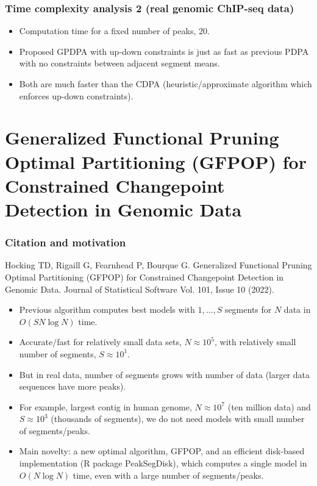 \documentclass[t]{beamer}
\begin{document}
\begin{frame}
  \frametitle{Time complexity analysis 2 (real genomic ChIP-seq data)}
  
  

  \begin{itemize}
  \item Computation time for a fixed number of peaks, 20.
  \item Proposed GPDPA with up-down constraints is just as fast as
    previous PDPA with no constraints between adjacent segment means.
  \item Both are much faster than the CDPA (heuristic/approximate
    algorithm which enforces up-down constraints).
  \end{itemize}

\end{frame}

\section{Generalized Functional Pruning Optimal Partitioning (GFPOP)
  for Constrained Changepoint Detection in Genomic Data}

\begin{frame}
  \frametitle{Citation and motivation}
  Hocking TD, Rigaill G, Fearnhead P, Bourque G. Generalized
  Functional Pruning Optimal Partitioning (GFPOP) for Constrained
  Changepoint Detection in Genomic Data. Journal of Statistical
  Software Vol. 101, Issue 10 (2022).

  \begin{itemize}
  \item Previous algorithm computes best models with $1,\dots,S$
    segments for $N$ data in $O(S N\log N)$ time.
  \item Accurate/fast for relatively small data sets, $N\approx 10^5$,
    with relatively small number of segments, $S\approx 10^1$.
  \item But in real data, number of segments grows with number of data
    (larger data sequences have more peaks).
  \item For example, largest contig in human genome, $N\approx 10^7$
    (ten million data) and $S\approx 10^3$ (thousands of segments), we
    do not need models with small number of segments/peaks.
  \item Main novelty: a new optimal algorithm, GFPOP, and an efficient
    disk-based implementation (R package PeakSegDisk), which computes
    a single model in $O(N\log N)$ time, even with
    a large number of segments/peaks.
  \end{itemize}

  
\end{frame}
\end{document}
